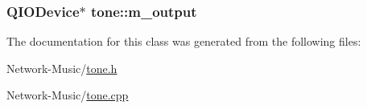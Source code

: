 \hypertarget{classtone_a97ac901b1b1e269ee5eb719e667485d3}{
\subsubsection[{m\-\_\-output}]{\setlength{\rightskip}{0pt plus 5cm}Q\-I\-O\-Device$\ast$ tone\-::m\-\_\-output\hspace{0.3cm}{\ttfamily [protected]}}}\label{classtone_a97ac901b1b1e269ee5eb719e667485d3}


The documentation for this class was generated from the following files\-:\begin{DoxyCompactItemize}
\item 
Network-\/\-Music/\hyperlink{tone_8h}{tone.\-h}\item 
Network-\/\-Music/\hyperlink{tone_8cpp}{tone.\-cpp}\end{DoxyCompactItemize}
